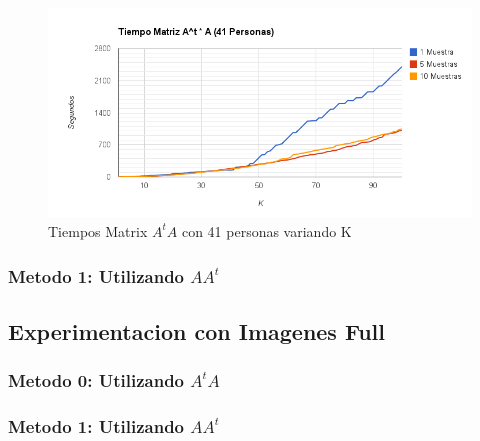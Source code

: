 \begin{figure}[H]
\includegraphics[width=1\textwidth]{img/image3.png}
     \caption{Tiempos Matrix $A^tA$ con 41 personas variando K}
     \label{fig:figura1}
\end{figure}




\subsubsection{Metodo 1: Utilizando $AA^t$}
\subsection{Experimentacion con Imagenes Full}
\subsubsection{Metodo 0: Utilizando $A^tA$}
\subsubsection{Metodo 1: Utilizando $AA^t$}